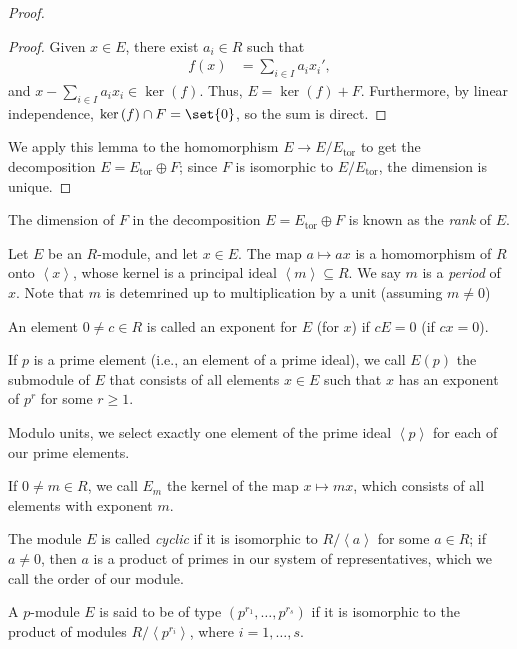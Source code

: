 \documentclass[10pt]{mypackage}
\DeclareMathOperator{\tor}{tor}
\begin{document}
\begin{proof}
\begin{proof}
    Given $x\in E$, there exist $a_i\in R$ such that
    \begin{align*}
      f(x) &= \sum_{i\in I}a_ix_i',
    \end{align*}
    and $x - \sum_{i\in I}a_ix_i\in \ker\left( f \right)$. Thus, $E = \ker\left( f \right) + F$. Furthermore, by linear independence, $\ker\left( f \right)\cap F = \set{0}$, so the sum is direct.
  \end{proof}
  We apply this lemma to the homomorphism $E\rightarrow E/E_{\tor}$ to get the decomposition $E = E_{\tor}\oplus F$; since $F$ is isomorphic to $E/E_{\tor}$, the dimension is unique.
\end{proof}
\begin{definition}
  The dimension of $F$ in the decomposition $E = E_{\tor}\oplus F$ is known as the \textit{rank} of $E$.
\end{definition}
\begin{definition}
  Let $E$ be an $R$-module, and let $x\in E$. The map $a\mapsto ax$ is a homomorphism of $R$ onto $\left\langle x \right\rangle$, whose kernel is a principal ideal $\left\langle m \right\rangle\subseteq R$. We say $m$ is a \textit{period} of $x$. Note that $m$ is detemrined up to multiplication by a unit (assuming $m\neq 0$)\newline

  An element $0\neq c\in R$ is called an exponent for $E$ (for $x$) if $cE = 0$ (if $cx = 0$).\newline

  If $p$ is a prime element (i.e., an element of a prime ideal), we call $E(p)$ the submodule of $E$ that consists of all elements $x\in E$ such that $x$ has an exponent of $p^{r}$ for some $r\geq 1$.
\end{definition}
\begin{remark}
Modulo units, we select exactly one element of the prime ideal $\left\langle p \right\rangle$ for each of our prime elements.
\end{remark}
\begin{definition}
  If $0\neq m\in R$, we call $E_m$ the kernel of the map $x\mapsto mx$, which consists of all elements with exponent $m$.\newline

  The module $E$ is called \textit{cyclic} if it is isomorphic to $R/\left\langle a \right\rangle$ for some $a\in R$; if $a\neq 0$, then $a$ is a product of primes in our system of representatives, which we call the order of our module.\newline

  A $p$-module $E$ is said to be of type $\left( p^{r_1},\dots,p^{r_s} \right)$ if it is isomorphic to the product of modules $R/\left\langle p^{r_i} \right\rangle$, where $i = 1,\dots,s$.
\end{definition}
\end{document}
